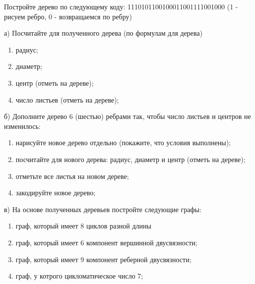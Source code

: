 \question 
Постройте дерево по следующему коду: 1110101100100011001111001000 (1 - рисуем ребро, 0 - возвращаемся по ребру)

а) Посчитайте для полученного дерева (по формулам для дерева)
\begin{enumerate}
\item радиус;
\item диаметр;
\item центр (отметь на дереве);
\item число листьев (отметь на дереве);
\end{enumerate}

б) Дополните дерево 6 (шестью) ребрами так, чтобы число листьев и центров не изменилось:
\begin{enumerate}
\item нарисуйте новое дерево отдельно (покажите, что условия выполнены);
\item посчитайте для нового дерева: радиус, диаметр и центр (отметь на дереве);
\item отметьте все листья на  новом дереве;
\item закодируйте новое дерево;
\end{enumerate}

в) На основе полученных деревьев  постройте следующие графы:
\begin{enumerate}
\item граф, который имеет 8 циклов разной длины
\item граф, который имеет 6 компонент вершинной двусвязности;
\item граф, который имеет 9 компонент реберной двусвязности;
\item граф, у котрого цикломатическое число 7;
\end{enumerate}